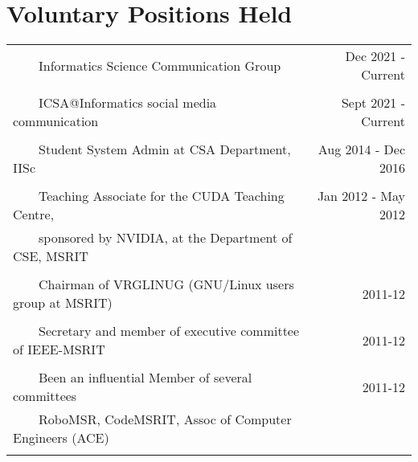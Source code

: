 \documentclass[a4paper,10pt]{article} %
\newcommand{\tabitem}{~~\llap{\textbullet}~~}
\begin{document}
\section{Voluntary Positions Held}

\begin{tabular}{lr}
	\tabitem Informatics Science Communication Group & Dec 2021 - Current \\
	&\\
	\tabitem ICSA@Informatics social media communication & Sept 2021 - Current \\
	& \\
	\tabitem Student System Admin at CSA Department, IISc & Aug 2014 - Dec 2016 \\
	&\\
	\tabitem Teaching Associate for the CUDA Teaching Centre,  & Jan 2012 - May 2012\\
	~~~~sponsored by NVIDIA, at the Department of CSE, MSRIT &  \\
	&\\
	\tabitem Chairman of VRGLINUG (GNU/Linux users group at MSRIT) & 2011-12 \\
	&\\
	\tabitem Secretary and member of executive committee of IEEE-MSRIT & 2011-12 \\
	&\\
	\tabitem Been an influential Member of several committees & 2011-12 \\
	~~~~RoboMSR, CodeMSRIT, Assoc of Computer Engineers (ACE) & \\
	&\\
\end{tabular}
\end{document}
